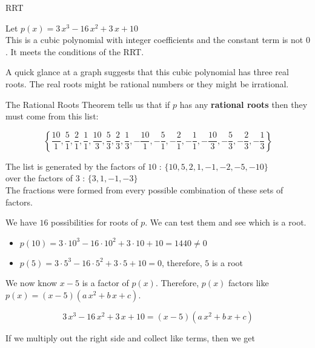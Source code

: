 \documentclass{ximera}
\begin{document}
\begin{example} RRT


Let $p(x) = 3\, x^3 - 16 \, x^2 + 3 \, x + 10$ \\


This is a cubic polynomial with integer coefficients and the constant term is not $0$. It meets the conditions of the RRT.


A quick glance at a graph suggests that this cubic polynomial has three real roots. The real roots might be rational numbers or they might be irrational.

The Rational Roots Theorem tells us that if $p$ has any \textbf{rational roots} then they must come from this list:


\[
\left\{  \frac{10}{1},  \frac{5}{1}, \frac{2}{1}, \frac{1}{1}, \frac{10}{3},  \frac{5}{3}, \frac{2}{3}, \frac{1}{3},   -\frac{10}{1},  -\frac{5}{1}, -\frac{2}{1}, -\frac{1}{1}, -\frac{10}{3},  -\frac{5}{3}, -\frac{2}{3}, -\frac{1}{3}                   \right\}
\]


The list is generated by the factors of $10$ : $\{ 10, 5, 2, 1, -1, -2, -5, -10 \}$ \\

over the factors of $3$ : $\{ 3, 1, -1, -3 \}$ \\


The fractions were formed from every possible combination of these sets of factors.


We have $16$ possibilities for roots of $p$.  We can test them and see which is a root.


\begin{itemize}
\item $p(10) =  3 \cdot 10^3 - 16 \cdot 10^2 + 3 \cdot 10 + 10 = 1440 \ne 0$ \\
\item $p(5) =  3 \cdot 5^3 - 16 \cdot 5^2 + 3 \cdot 5 + 10 = 0$, therefore,  $5$ is a root\\
\end{itemize}


We now know $x-5$ is a factor of $p(x)$.  Therefore, $p(x)$ factors like $p(x) = (x-5) (a \, x^2 + b \, x + c)$.







\[
3\, x^3 - 16 \, x^2 + 3 \, x + 10  = (x-5) (a \, x^2 + b \, x + c) 
\]


If we multiply out the right side and collect like terms, then we get



\end{example}
\end{document}
